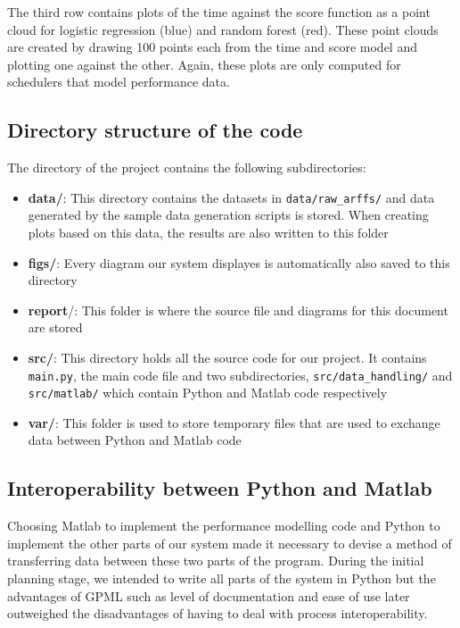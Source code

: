 \documentclass[a4paper,12pt,twoside,openright]{report}
\begin{document}
The third row contains plots of the time against the score function as a point cloud for logistic regression (blue) and random forest (red). These point clouds are created by drawing 100 points each from the time and score model and plotting one against the other. Again, these plots are only computed for schedulers that model performance data.





\subsection{Directory structure of the code}

The directory of the project contains the following subdirectories:
\begin{itemize}
\item \textbf{data/}: This directory contains the datasets in \texttt{data/raw\_arffs/} and data generated by the sample data generation scripts is stored. When creating plots based on this data, the results are also written to this folder
\item \textbf{figs/}: Every diagram our system displayes is automatically also saved to this directory
\item \textbf{report}/: This folder is where the source file and diagrams for this document are stored
\item \textbf{src/}: This directory holds all the source code for our project. It contains \texttt{main.py}, the main code file and two subdirectories, \texttt{src/data\_handling/} and \texttt{src/matlab/} which contain Python and Matlab code respectively
\item \textbf{var/}: This folder is used to store temporary files that are used to exchange data between Python and Matlab code
\end{itemize}



\subsection{Interoperability between Python and Matlab}
Choosing Matlab to implement the performance modelling code and Python to implement the other parts of our system made it necessary to devise a method of transferring data between these two parts of the program. During the initial planning stage, we intended to write all parts of the system in Python but the advantages of GPML such as level of documentation and ease of use later outweighed the disadvantages of having to deal with process interoperability.
\end{document}
